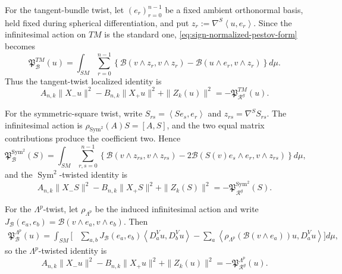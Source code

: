 \documentclass[reqno,11pt]{amsart}
\theoremstyle{definition}
\newcommand{\SM}{SM}
\newcommand{\Rop}{\mathscr R}
\newcommand{\cB}{\mathcal B}
\newcommand{\Sym}{\operatorname{Sym}}
\newcommand{\inner}[2]{\left\langle #1,#2\right\rangle}
\begin{document}
For the tangent-bundle twist, let $(e_r)_{r=0}^{n-1}$ be a fixed ambient
orthonormal basis, held fixed during spherical differentiation, and put
$z_r:=\nabla^S\inner{u}{e_r}$.  Since the infinitesimal action on $TM$ is the
standard one, \eqref{eq:sign-normalized-pestov-form} becomes
\begin{equation}\label{eq:tangent-pestov-form}
  \mathfrak P_{\cB}^{TM}(u)
  =\int_{\SM}\sum_{r=0}^{n-1}
  \left\{
    \cB(v\wedge z_r,v\wedge z_r)
    -\cB(u\wedge e_r,v\wedge z_r)
  \right\}d\mu.
\end{equation}
Thus the tangent-twist localized identity is
\begin{equation*}
  A_{n,k}\|X_-u\|^2-B_{n,k}\|X_+u\|^2+\|Z_k(u)\|^2
  =-\mathfrak P_{\Rop^g}^{TM}(u).
\end{equation*}

For the symmetric-square twist, write
$S_{rs}=\inner{S e_s}{e_r}$ and $z_{rs}=\nabla^SS_{rs}$.  The infinitesimal
action is $\rho_{\Sym^2}(A)S=[A,S]$, and the two equal matrix contributions
produce the coefficient two.  Hence
\begin{equation}\label{eq:sym2-pestov-form-normalized}
  \mathfrak P_{\cB}^{\Sym^2}(S)
  =\int_{\SM}\sum_{r,s=0}^{n-1}
  \left\{
    \cB(v\wedge z_{rs},v\wedge z_{rs})
    -2\cB(S(v)e_s\wedge e_r,v\wedge z_{rs})
  \right\}d\mu,
\end{equation}
and the $\Sym^2$-twisted identity is
\begin{equation*}
  A_{n,k}\|X_-S\|^2-B_{n,k}\|X_+S\|^2+\|Z_k(S)\|^2
  =-\mathfrak P_{\Rop^g}^{\Sym^2}(S).
\end{equation*}

For the $\Lambda^p$-twist, let $\rho_{\Lambda^p}$ be the induced infinitesimal
action and write
$J_{\cB}(e_a,e_b)=\cB(v\wedge e_a,v\wedge e_b)$.  Then
\begin{equation*}
\begin{split}
  \mathfrak P_{\cB}^{\Lambda^p}(u)=\int_{\SM}\bigg[{}
  &\sum_{a,b}J_{\cB}(e_a,e_b)
       \inner{D_a^Vu}{D_b^Vu}-\sum_a\inner{
       \rho_{\Lambda^p}(\cB(v\wedge e_a))u}{D_a^Vu}
  \bigg]d\mu,
\end{split}
\end{equation*}
so the $\Lambda^p$-twisted identity is
\begin{equation*}
  A_{n,k}\|X_-u\|^2-B_{n,k}\|X_+u\|^2+\|Z_k(u)\|^2
  =-\mathfrak P_{\Rop^g}^{\Lambda^p}(u).
\end{equation*}
\end{document}
